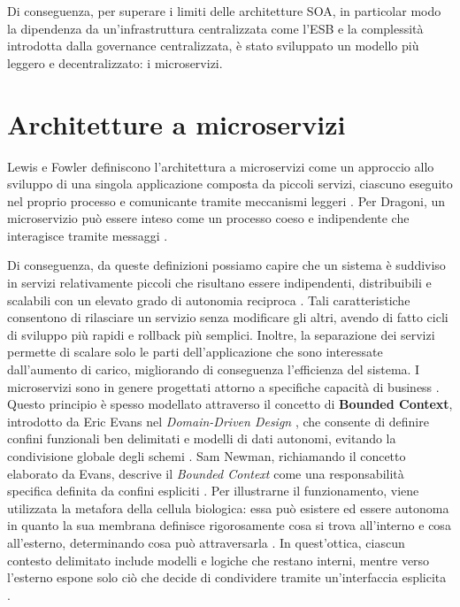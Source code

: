 Di conseguenza, per superare i limiti delle architetture SOA, in particolar modo la dipendenza da un'infrastruttura centralizzata
come l'ESB e la complessità introdotta dalla governance centralizzata, è stato sviluppato un modello più leggero e decentralizzato: i microservizi.


\section{Architetture a microservizi}
Lewis e Fowler definiscono l’architettura a microservizi come un approccio allo sviluppo di una singola applicazione composta da piccoli servizi, ciascuno eseguito nel proprio processo e comunicante tramite meccanismi leggeri \cite{Fowler2014}. Per Dragoni, un microservizio può essere inteso come un processo coeso e indipendente che interagisce tramite messaggi \cite{Dragoni2017}.

Di conseguenza, da queste definizioni possiamo capire che un sistema è suddiviso in servizi relativamente piccoli che risultano essere indipendenti, distribuibili e scalabili con un elevato grado di autonomia reciproca \cite{Fowler2014, Dragoni2017}. Tali caratteristiche consentono di rilasciare un servizio senza modificare gli altri, avendo di fatto cicli di sviluppo più rapidi e rollback più semplici. Inoltre, la separazione dei servizi permette di scalare solo le parti dell’applicazione che sono interessate dall'aumento di carico, migliorando di conseguenza l'efficienza del sistema. 
I microservizi sono in genere progettati attorno a specifiche capacità di business \cite{Fowler2014, Richardson2018}. Questo principio è spesso modellato attraverso il concetto di \textbf{Bounded Context}, introdotto da Eric Evans nel \textit{Domain-Driven Design} \cite{evans2003domain}, che consente di definire confini funzionali ben delimitati e modelli di dati autonomi, evitando la condivisione globale degli schemi \cite{Cerny2017SOAvsMicroservices}. Sam Newman, richiamando il concetto elaborato da Evans, descrive il \textit{Bounded Context} come una responsabilità specifica definita da confini espliciti \cite{Newman2015}. Per illustrarne il funzionamento, viene utilizzata la metafora della cellula biologica: essa può esistere ed essere autonoma in quanto la sua membrana definisce rigorosamente cosa si trova all'interno e cosa all'esterno, determinando cosa può attraversarla \cite{Newman2015}. In quest’ottica, ciascun contesto delimitato include modelli e logiche che restano interni, mentre verso l’esterno espone solo ciò che decide di condividere tramite un’interfaccia esplicita \cite{Newman2015}.

